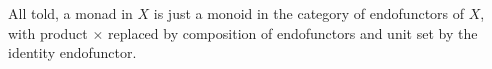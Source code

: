 \documentclass[include/preamble.tex]{subfiles}
\begin{document}
\begin{frame}
  \begin{displayquote}
    All told, a monad in \(X\) is just a monoid in the category of
    endofunctors of \(X\), with product \(\times\) replaced by composition of
    endofunctors and unit set by the identity endofunctor.
  \end{displayquote}
\end{frame}
\end{document}
